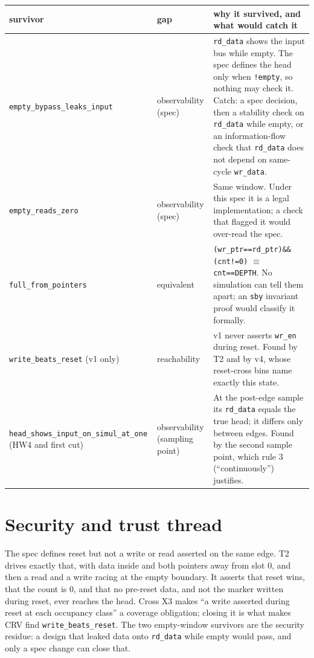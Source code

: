 \documentclass[10pt]{article}
\newcommand{\code}[1]{\texttt{#1}}
\begin{document}
\begin{center}\small
\begin{tabular}{p{3.9cm}p{2.5cm}p{9.5cm}}
\toprule
survivor & gap & why it survived, and what would catch it\\
\midrule
\code{empty\_bypass\_\allowbreak leaks\_input} & observability (spec) & \code{rd\_data} shows the input bus while empty. The spec defines the head only when \code{!empty}, so nothing may check it. Catch: a spec decision, then a stability check on \code{rd\_data} while empty, or an information-flow check that \code{rd\_data} does not depend on same-cycle \code{wr\_data}.\\
\code{empty\_reads\_zero} & observability (spec) & Same window. Under this spec it is a legal implementation; a check that flagged it would over-read the spec.\\
\code{full\_from\_pointers} & equivalent & \code{(wr\_ptr==rd\_ptr)\&\&(cnt!=0)} $\equiv$ \code{cnt==DEPTH}. No simulation can tell them apart; an \code{sby} invariant proof would classify it formally.\\
\code{write\_beats\_reset} (v1 only) & reachability & v1 never asserts \code{wr\_en} during reset. Found by T2 and by v4, whose reset-cross bins name exactly this state.\\
\code{head\_shows\_input\_\allowbreak on\_simul\_at\_one} (HW4 and first cut) & observability (sampling point) & At the post-edge sample its \code{rd\_data} equals the true head; it differs only between edges. Found by the second sample point, which rule 3 (``continuously'') justifies.\\
\bottomrule
\end{tabular}
\end{center}

\section{Security and trust thread}
The spec defines reset but not a write or read asserted on the same edge. T2 drives exactly that, with data inside and both pointers away from slot 0, and then a read and a write racing at the empty boundary. It asserts that reset wins, that the count is 0, and that no pre-reset data, and not the marker written during reset, ever reaches the head. Cross X3 makes ``a write asserted during reset at each occupancy class'' a coverage obligation; closing it is what makes CRV find \code{write\_beats\_reset}. The two empty-window survivors are the security residue: a design that leaked data onto \code{rd\_data} while empty would pass, and only a spec change can close that.
\end{document}
